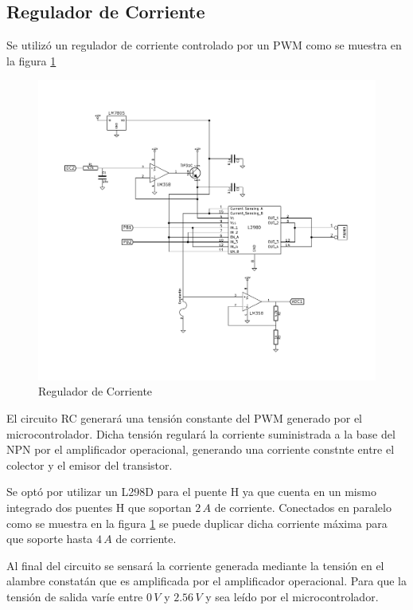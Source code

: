 \documentclass[10pt,spanish,a4paper,openany,notitlepage]{article}
\begin{document}
\subsection{Regulador de Corriente}

Se utilizó un regulador de corriente controlado por un PWM como se muestra
en la figura \ref{fig:reg_corriente}

\begin{figure}[H] %
\begin{center}
\includegraphics[scale=0.75]{../circuitos/regulador_corriente.pdf}
\caption{Regulador de Corriente}
 \label{fig:reg_corriente}
\end{center}
\end{figure}

El circuito RC generará una tensión constante del PWM generado por el
microcontrolador. Dicha tensión regulará la corriente suministrada a la
base del NPN por el amplificador operacional, generando una corriente
constnte entre el colector y el emisor del transistor.

Se optó por utilizar un L298D para el puente H ya que cuenta en un mismo
integrado dos puentes H que soportan $2\, \unit{A}$ de corriente. 
Conectados en paralelo como se muestra en la figura \ref{fig:reg_corriente} 
se puede duplicar dicha corriente máxima para que soporte hasta $4\, \unit{A}$ de corriente.

Al final del circuito se sensará la corriente generada mediante la tensión
en el alambre constatán que es amplificada por el amplificador operacional.
Para que la tensión de salida varíe entre $0\, \unit{V}$ y $2.56\, \unit{V}$
y sea leído por el microcontrolador.
\end{document}
